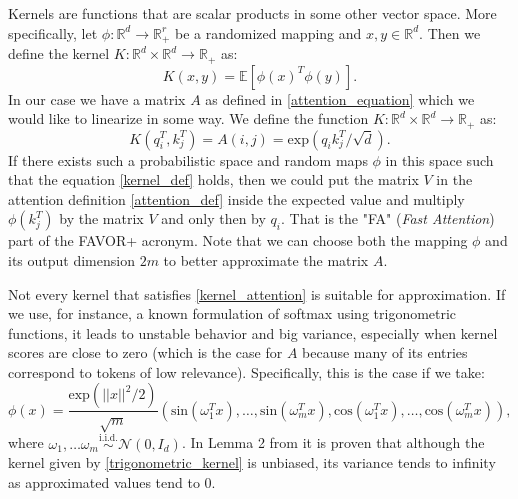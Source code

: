\documentclass[en]{pracamgr}
\begin{document}
Kernels are functions that are scalar products in some other vector space. More specifically, let $\phi : \mathbb{R}^d \rightarrow \mathbb{R}^r_+$ be a randomized mapping and $x, y \in \mathbb{R}^d$. Then we define the kernel $K:\mathbb{R}^d \times \mathbb{R}^d \rightarrow \mathbb{R}_+$ as:
\begin{equation}
    K(x,y) = \mathbb{E} \left[\phi(x)^T\phi(y)\right].
\label{kernel_def}\end{equation}
In our case we have a matrix $A$ as defined in \ref{attention_equation} which we would like to linearize in some way. We define the function $K:\mathbb{R}^d \times \mathbb{R}^d \rightarrow \mathbb{R}_+$ as:
\begin{equation}
    K(q_i^T, k_j^T) = A(i,j) = \textrm{exp}\left(q_i k_j^T/\sqrt{d}\right).
\label{kernel_attention}\end{equation}
If there exists such a probabilistic space and random maps $\phi$ in this space such that the equation \ref{kernel_def} holds, then we could put the matrix $V$ in the attention definition \ref{attention_def} inside the expected value and multiply $\phi(k_j^T)$ by the matrix $V$ and only then by $q_i$. That is the "FA" (\textit{Fast Attention}) part of the FAVOR+ acronym.
Note that we can choose both the mapping $\phi$ and its output dimension $2m$ to better approximate the matrix $A$.


Not every kernel that satisfies \ref{kernel_attention} is suitable for approximation. If we use, for instance, a known formulation of softmax using trigonometric functions, it leads to unstable behavior and big variance, especially when kernel scores are close to zero (which is the case for $A$ because many of its entries correspond to tokens of low relevance). Specifically, this is the case if we take:
\begin{equation}\label{trigonometric_kernel}
    \phi(x) = \frac{\textrm{exp}(||x||^2/2)}{\sqrt{m}}\left(\textrm{sin}(\omega _1^T x), \ldots, \textrm{sin}(\omega _m^T x), \textrm{cos}(\omega _1^T x), \ldots, \textrm{cos}(\omega _m^T x)\right),
\end{equation}
where $\omega _1, \ldots \omega _m \stackrel{\textrm{i.i.d.}}{\sim} \mathcal{N}(0, I_d)$. In Lemma 2 from \cite{DBLP:conf/iclr/ChoromanskiLDSG21} it is proven that although the kernel given by \ref{trigonometric_kernel} is unbiased, its variance tends to infinity as approximated values tend to 0.
\end{document}
